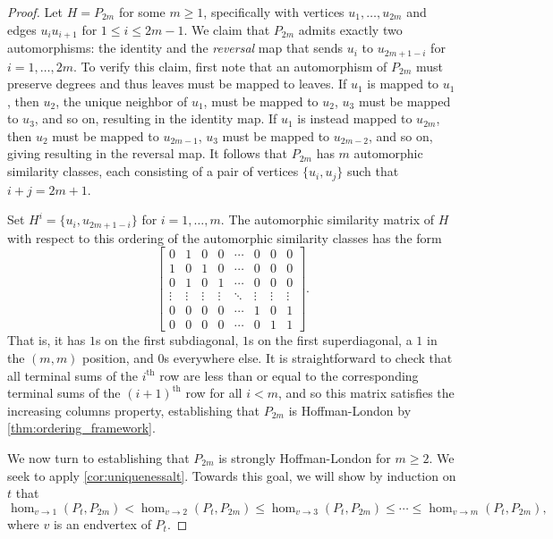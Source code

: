 \documentclass[11pt]{article}
\theoremstyle{definition}
\newcommand{\ith}[1]{$#1^{\text{th}}$}
\newcommand{\homclass}[4]{\hom_{#1\to#2}(#3,#4)}
\begin{document}
\begin{proof}
Let $H = P_{2m}$ for some $m \ge 1$, specifically with vertices $u_1, \ldots, u_{2m}$ and edges $u_iu_{i+1}$ for $1 \le i \le 2m-1$. We claim that $P_{2m}$ admits exactly two automorphisms: the identity and the {\it reversal} map that sends $u_i$ to $u_{2m+1-i}$ for $i=1, \ldots, 2m$. To verify this claim, first note that an automorphism of $P_{2m}$ must preserve degrees and thus leaves must be mapped to leaves. If $u_1$ is mapped to $u_1$, then $u_2$, the unique neighbor of $u_1$, must be mapped to $u_2$, $u_3$ must be mapped to $u_3$, and so on, resulting in the identity map. If $u_1$ is instead mapped to $u_{2m}$, then $u_2$ must be mapped to $u_{2m-1}$, $u_3$ must be mapped to $u_{2m-2}$, and so on, giving resulting in the reversal map. It follows that $P_{2m}$ has $m$ automorphic similarity classes, each consisting of a pair of vertices $\{u_i,u_j\}$ such that $i+j=2m+1$. 

Set $H^i=\{u_i, u_{2m+1-i}\}$ for $i=1, \ldots, m$. The automorphic similarity matrix of $H$ with respect to this ordering of the automorphic similarity classes has the form 
\[ \begin{bmatrix}
0 & 1 & 0 & 0 & \cdots & 0 & 0 & 0\\
1 & 0 & 1 & 0 & \cdots & 0 & 0 & 0\\
0 & 1 & 0 & 1 & \cdots & 0 & 0 & 0\\
\vdots & \vdots & \vdots & \vdots & \ddots & \vdots & \vdots& \vdots\\
0 & 0 & 0 & 0 & \cdots & 1 & 0 & 1\\
0 & 0 & 0 & 0 & \cdots & 0 & 1 & 1
    \end{bmatrix}. \]
That is, it has $1$s on the first subdiagonal, $1$s on the first superdiagonal, a $1$ in the $(m,m)$ position, and $0$s everywhere else. It is straightforward to check that all terminal sums of the \ith{i} row are less than or equal to the corresponding terminal sums of the \ith{(i+1)} row for all $i < m$, and so this matrix satisfies the increasing columns property, establishing that $P_{2m}$ is Hoffman-London by \cref{thm:ordering_framework}.

We now turn to establishing that $P_{2m}$ is strongly Hoffman-London for $m \ge 2$. We seek to apply \cref{cor:uniquenessalt}. Towards this goal, we will show by induction on $t$ that
\begin{equation} \label{inq:paths}
\homclass{v}{1}{P_t}{P_{2m}} < \homclass{v}{2}{P_t}{P_{2m}} \le \homclass{v}{3}{P_t}{P_{2m}} \le \cdots \le \homclass{v}{m}{P_t}{P_{2m}},
\end{equation}
where $v$ is an endvertex of $P_t$.


\end{proof}
\end{document}
